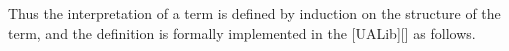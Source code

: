 Thus the interpretation of a term is defined by induction on the
structure of the term, and the definition is formally implemented in the
{[}UALib{]}{[}{]} as follows.
\ccpad
\begin{code}%
\>[0]\AgdaSpace{}%
\AgdaModule{\AgdaUnderscore{}}\AgdaSpace{}%
\AgdaSymbol{\{}\AgdaSpace{}%
\AgdaSpace{}%
\AgdaSymbol{:}\AgdaSpace{}%
\AgdaSymbol{\}\{}\AgdaSpace{}%
\AgdaSymbol{:}\AgdaSpace{}%
\AgdaSpace{}%
\AgdaSpace{}%
\AgdaSymbol{\}}\AgdaSpace{}%
\<%
\\
%
\\[\AgdaEmptyExtraSkip]%
\>[0][@{}l@{\AgdaIndent{0}}]%
\>[1]\AgdaSpace{}%
\AgdaSymbol{:}\AgdaSpace{}%
\AgdaSpace{}%
\AgdaSpace{}%
\AgdaSpace{}%
\AgdaSymbol{(}\AgdaSpace{}%
\AgdaSymbol{:}\AgdaSpace{}%
\AgdaSpace{}%
\AgdaSpace{}%
\AgdaSymbol{)}\AgdaSpace{}%
\AgdaSpace{}%
\AgdaSymbol{(}\AgdaSpace{}%
\AgdaSpace{}%
\AgdaSpace{}%
\AgdaSpace{}%
\AgdaSymbol{)}\AgdaSpace{}%
\AgdaSpace{}%
\AgdaSpace{}%
\AgdaSpace{}%
\<%
\\
%
\\[\AgdaEmptyExtraSkip]%
%
\>[1]\AgdaSymbol{(}\AgdaSpace{}%
\AgdaSpace{}%
\AgdaSpace{}%
\AgdaSymbol{)}\AgdaSpace{}%
\AgdaSpace{}%
\AgdaSymbol{=}\AgdaSpace{}%
\AgdaSpace{}%
\<%
\\
%
\\[\AgdaEmptyExtraSkip]%
%
\>[1]\AgdaSymbol{(}\AgdaSpace{}%
\AgdaSpace{}%
\AgdaSpace{}%
\AgdaSpace{}%
\AgdaSymbol{)}\AgdaSpace{}%
\AgdaSpace{}%
\AgdaSymbol{=}\AgdaSpace{}%
\AgdaSymbol{(}\AgdaSpace{}%
\AgdaSpace{}%
\AgdaSymbol{)}\AgdaSpace{}%
\AgdaSpace{}%
\AgdaSpace{}%
\AgdaSpace{}%
\AgdaSymbol{(}\AgdaSpace{}%
\AgdaSpace{}%
\AgdaSpace{}%
\AgdaSymbol{)}\AgdaSpace{}%
\<%
\\
\>[0]\<%
\end{code}

